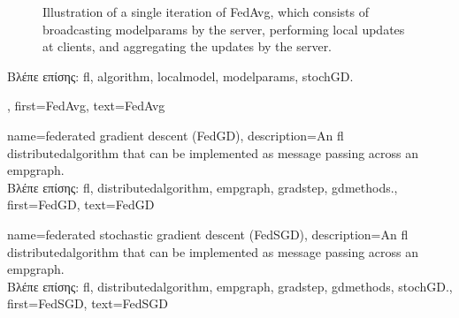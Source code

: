 {{\begin{figure}[H]
\begin{center}
			\end{center}
			\caption{Illustration of a single iteration of FedAvg, which consists of broadcasting \gls{modelparams} by the 
			server, performing local updates at clients, and aggregating the updates by the server. 
			\label{fig_single_iteration_fedavg_dict}} 
		\end{figure} 
		\foreignlanguage{greek}{Βλέπε επίσης:} \gls{fl}, \gls{algorithm}, \gls{localmodel}, \gls{modelparams}, \gls{stochGD}.},
	first={FedAvg},
	text={Fed\-Avg}
} 

{name={federated gradient descent (FedGD)},
	description={An \gls{fl} \gls{distributedalgorithm} that 
		can be implemented as message passing across an \gls{empgraph}. \\ 
		\foreignlanguage{greek}{Βλέπε επίσης:} \gls{fl}, \gls{distributedalgorithm}, \gls{empgraph}, \gls{gradstep}, \gls{gdmethods}.},
	first={FedGD},
	text={FedGD}
} 

{name={federated stochastic gradient descent (FedSGD)},
	description={An \gls{fl} \gls{distributedalgorithm} that 
		can be implemented as message passing across an \gls{empgraph}. \\ 
		\foreignlanguage{greek}{Βλέπε επίσης:} \gls{fl}, \gls{distributedalgorithm}, \gls{empgraph}, \gls{gradstep}, \gls{gdmethods}, \gls{stochGD}.},
	first={FedSGD},
	text={FedSGD}
} 


